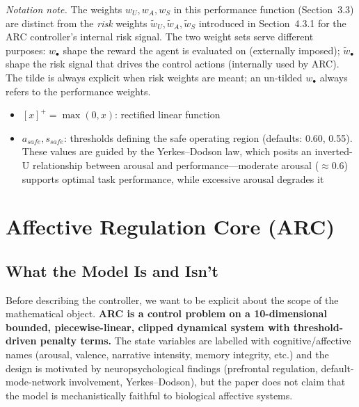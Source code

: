 \documentclass{article}
\begin{document}
\emph{Notation note.} The weights $w_U, w_A, w_S$ in this performance function (Section~3.3) are distinct from the \emph{risk} weights $\tilde{w}_U, \tilde{w}_A, \tilde{w}_S$ introduced in Section~4.3.1 for the ARC controller's internal risk signal. The two weight sets serve different purposes: $w_\bullet$ shape the reward the agent is evaluated on (externally imposed); $\tilde{w}_\bullet$ shape the risk signal that drives the control actions (internally used by ARC). The tilde is always explicit when risk weights are meant; an un-tilded $w_\bullet$ always refers to the performance weights.

\begin{itemize}
    \item $[x]^+ = \max(0, x)$: rectified linear function
    \item $a_{safe}, s_{safe}$: thresholds defining the safe operating region (defaults: 0.60, 0.55). These values are guided by the Yerkes--Dodson law, which posits an inverted-U relationship between arousal and performance---moderate arousal ($\approx 0.6$) supports optimal task performance, while excessive arousal degrades it \cite{Yerkes1908,Hebb1955}
\end{itemize}

\section{Affective Regulation Core (ARC)}

\subsection{What the Model Is and Isn't}

Before describing the controller, we want to be explicit about the scope of the mathematical object. \textbf{ARC is a control problem on a 10-dimensional bounded, piecewise-linear, clipped dynamical system with threshold-driven penalty terms.} The state variables are labelled with cognitive/affective names (arousal, valence, narrative intensity, memory integrity, etc.) and the design is motivated by neuropsychological findings (prefrontal regulation, default-mode-network involvement, Yerkes--Dodson), but the paper does not claim that the model is mechanistically faithful to biological affective systems.
\end{document}

